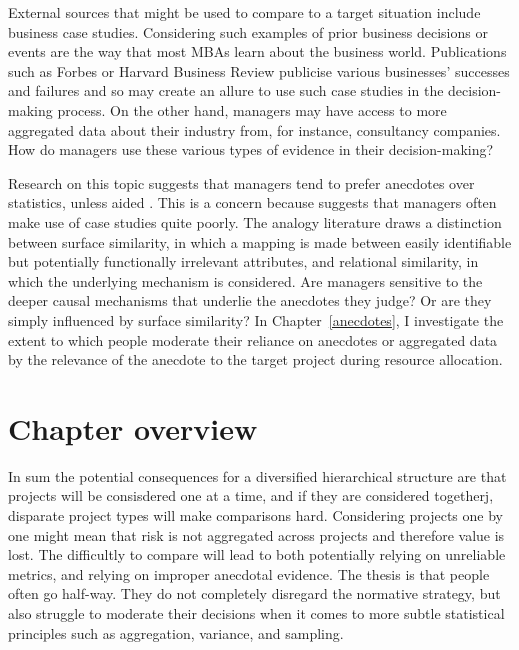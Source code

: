 \documentclass[a4paper, nobind, dvipsnames]{templates/ociamthesis}
\theoremstyle{definition}
\theoremstyle{definition}
\theoremstyle{definition}
\theoremstyle{definition}
\theoremstyle{remark}
\begin{document}
External sources that might be used to compare to a target situation include
business case studies. Considering such examples of prior business decisions or
events are the way that most MBAs learn about the business world. Publications
such as Forbes or Harvard Business Review publicise various businesses'
successes and failures and so may create an allure to use such case studies in
the decision-making process. On the other hand, managers may have access to more
aggregated data about their industry from, for instance, consultancy companies.
How do managers use these various types of evidence in their decision-making?

Research on this topic suggests that managers tend to prefer anecdotes over
statistics, unless aided \autocite{wainberg2018}. This is a concern because \textcite{gavetti2005}
suggests that managers often make use of case studies quite poorly. The analogy
literature draws a distinction between surface similarity, in which a mapping is
made between easily identifiable but potentially functionally irrelevant
attributes, and relational similarity, in which the underlying mechanism is
considered. Are managers sensitive to the deeper causal mechanisms that underlie
the anecdotes they judge? Or are they simply influenced by surface similarity?
In Chapter~\ref{anecdotes}, I investigate the extent to which people moderate
their reliance on anecdotes or aggregated data by the relevance of the anecdote
to the target project during resource allocation.

\hypertarget{chapter-overview}{%
\section{Chapter overview}\label{chapter-overview}}

In sum the potential consequences for a diversified hierarchical structure are
that projects will be consisdered one at a time, and if they are considered
togetherj, disparate project types will make comparisons hard. Considering
projects one by one might mean that risk is not aggregated across projects and
therefore value is lost. The difficultly to compare will lead to both
potentially relying on unreliable metrics, and relying on improper anecdotal
evidence. The thesis is that people often go half-way. They do not completely
disregard the normative strategy, but also struggle to moderate their decisions
when it comes to more subtle statistical principles such as aggregation,
variance, and sampling.
\end{document}
